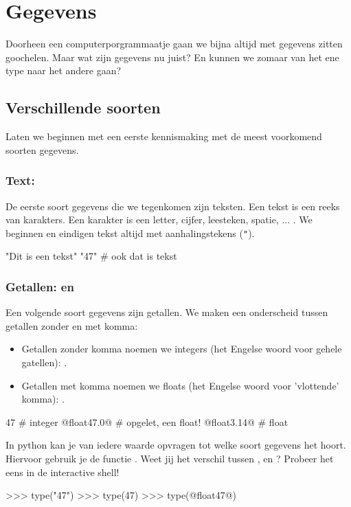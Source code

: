 \section{Gegevens}

Doorheen een computerporgrammaatje gaan we bijna altijd met gegevens zitten goochelen.
Maar wat zijn gegevens nu juist?
En kunnen we zomaar van het ene type naar het andere gaan?

\subsection{Verschillende soorten}

Laten we beginnen met een eerste kennismaking met de meest voorkomend soorten gegevens.

\subsubsection{Text: \stringtype}

De eerste soort gegevens die we tegenkomen zijn teksten.
Een tekst is een reeks van karakters.
Een karakter is een letter, cijfer, leesteken, spatie, ... .
We beginnen en eindigen tekst altijd met aanhalingstekens (\verb|"|).
\begin{pyEnv}
"Dit is een tekst"
"47"                        # ook dat is tekst
\end{pyEnv}

\subsubsection{Getallen: \integertype en \floattype}

Een volgende soort gegevens zijn getallen.
We maken een onderscheid tussen getallen zonder en met komma:
\begin{itemize}
\item Getallen zonder komma noemen we integers (het Engelse woord voor gehele gatellen): \integertype.
\item Getallen met komma noemen we floats (het Engelse woord voor 'vlottende' komma): \floattype.
\end{itemize}
\begin{pyEnv}
47                          # integer
@float47.0@                        # opgelet, een float!
@float3.14@                        # float
\end{pyEnv}

\begin{letsTryOut}
	In python kan je van iedere waarde opvragen tot welke soort gegevens het hoort.
	Hiervoor gebruik je de functie .
	\newline
	Weet jij het verschil tussen ,  en ?
	\newline
	Probeer het eens in de interactive shell!
\begin{pyEnv}
>>> type("47")
>>> type(47)
>>> type(@float47@)
\end{pyEnv}
\end{letsTryOut}

